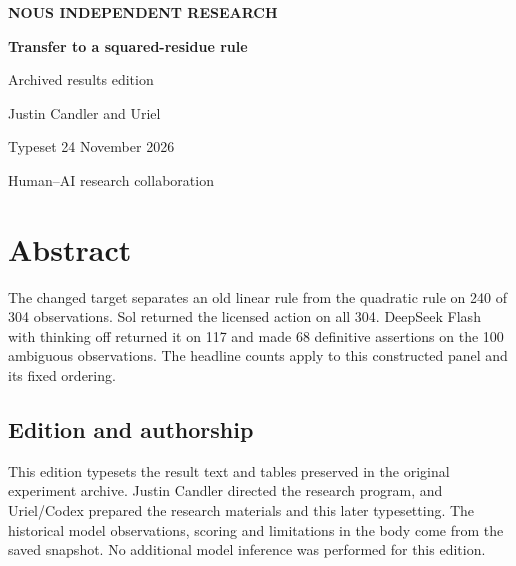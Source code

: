 \documentclass[11pt,letterpaper]{article}
\begin{document}
\begin{titlepage}\thispagestyle{empty}\centering\vspace*{.8in}

{\sffamily\bfseries\color{accent} NOUS INDEPENDENT RESEARCH}\par\vspace{.55in}

{\Huge\color{ink}\bfseries Transfer to a squared-residue rule}\par\vspace{.28in}

{\Large\color{mute} Archived results edition}\par\vspace{.5in}

{\large Justin Candler and Uriel}\par\vspace{.3in}Typeset 24 November 2026\par\vspace{.4in}

\par\vfill

\small Human–AI research collaboration\par\end{titlepage}

\section*{Abstract}

The changed target separates an old linear rule from the quadratic rule on 240 of 304 observations. Sol returned the licensed action on all 304. DeepSeek Flash with thinking off returned it on 117 and made 68 definitive assertions on the 100 ambiguous observations. The headline counts apply to this constructed panel and its fixed ordering.

\subsection*{Edition and authorship}

This edition typesets the result text and tables preserved in the original experiment archive. Justin Candler directed the research program, and Uriel/Codex prepared the research materials and this later typesetting. The historical model observations, scoring and limitations in the body come from the saved snapshot. No additional model inference was performed for this edition.
\end{document}
